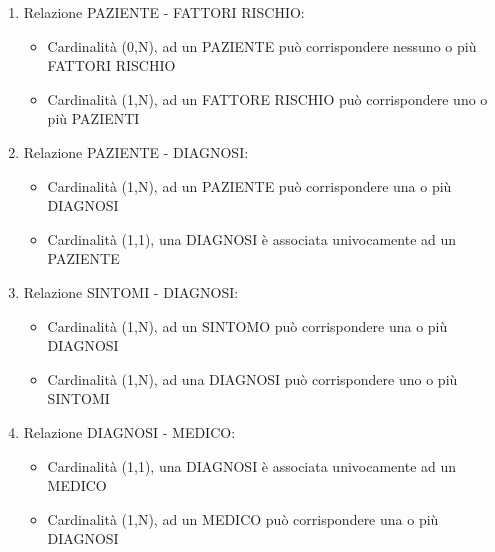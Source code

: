 \documentclass[a4paper,titlepage]{article}
\begin{document}
\begin{enumerate}
\begin{itemize}[leftmargin=0.5cm, topsep=0.5cm, itemsep=0.2cm]
\end{itemize}

\item Relazione PAZIENTE - FATTORI RISCHIO:

\begin{itemize}[leftmargin=0.5cm, topsep=0.5cm, itemsep=0.2cm]

\item Cardinalità (0,N), ad un PAZIENTE può corrispondere nessuno o più FATTORI RISCHIO
\item Cardinalità (1,N), ad un FATTORE RISCHIO può corrispondere uno o più PAZIENTI

\end{itemize}

\item Relazione PAZIENTE - DIAGNOSI:

\begin{itemize}[leftmargin=0.5cm, topsep=0.5cm, itemsep=0.2cm]

\item Cardinalità (1,N), ad un PAZIENTE può corrispondere una o più DIAGNOSI
\item Cardinalità (1,1), una DIAGNOSI è associata univocamente ad un PAZIENTE

\end{itemize}

\item Relazione SINTOMI - DIAGNOSI:

\begin{itemize}[leftmargin=0.5cm, topsep=0.5cm, itemsep=0.2cm]

\item Cardinalità (1,N), ad un SINTOMO può corrispondere una o più DIAGNOSI
\item Cardinalità (1,N), ad una DIAGNOSI può corrispondere uno o più SINTOMI

\end{itemize}

\item Relazione DIAGNOSI - MEDICO:

\begin{itemize}[leftmargin=0.5cm, topsep=0.5cm, itemsep=0.2cm]

\item Cardinalità (1,1), una DIAGNOSI è associata univocamente ad un MEDICO
\item Cardinalità (1,N), ad un MEDICO può corrispondere una o più DIAGNOSI

\end{itemize}


\end{enumerate}
\end{document}
